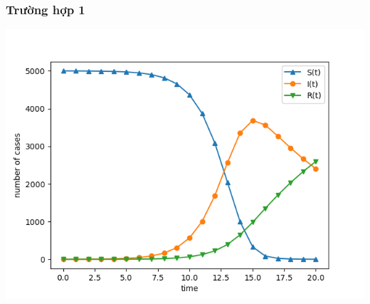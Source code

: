 \documentclass[a4paper]{article}
\begin{document}
\subsubsection{Trường hợp 1}
\begin{center}
\includegraphics{Images/5000 1 0 0_0002 0_1.png}
\end{center}
\end{document}
